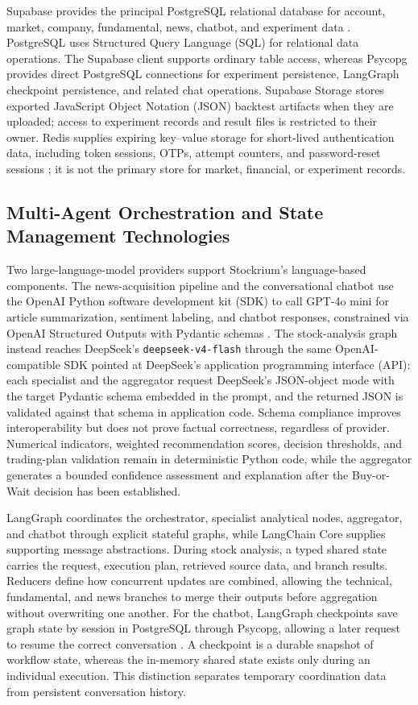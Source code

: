 Supabase provides the principal PostgreSQL relational database for account, market, company, fundamental, news, chatbot, and experiment data \cite{supabaseDatabase2026}. PostgreSQL uses Structured Query Language (SQL) for relational data operations. The Supabase client supports ordinary table access, whereas Psycopg provides direct PostgreSQL connections for experiment persistence, LangGraph checkpoint persistence, and related chat operations. Supabase Storage stores exported JavaScript Object Notation (JSON) backtest artifacts when they are uploaded; access to experiment records and result files is restricted to their owner. Redis supplies expiring key--value storage for short-lived authentication data, including token sessions, OTPs, attempt counters, and password-reset sessions \cite{redisDataTypes2026}; it is not the primary store for market, financial, or experiment records.

\subsection{Multi-Agent Orchestration and State Management Technologies}

Two large-language-model providers support Stockrium's language-based components. The news-acquisition pipeline and the conversational chatbot use the OpenAI Python software development kit (SDK) to call GPT-4o mini for article summarization, sentiment labeling, and chatbot responses, constrained via OpenAI Structured Outputs with Pydantic schemas \cite{openaiStructuredOutputs2026}. The stock-analysis graph instead reaches DeepSeek's \texttt{deepseek-v4-flash} through the same OpenAI-compatible SDK pointed at DeepSeek's application programming interface (API): each specialist and the aggregator request DeepSeek's JSON-object mode with the target Pydantic schema embedded in the prompt, and the returned JSON is validated against that schema in application code. Schema compliance improves interoperability but does not prove factual correctness, regardless of provider. Numerical indicators, weighted recommendation scores, decision thresholds, and trading-plan validation remain in deterministic Python code, while the aggregator generates a bounded confidence assessment and explanation after the Buy-or-Wait decision has been established.

LangGraph coordinates the orchestrator, specialist analytical nodes, aggregator, and chatbot through explicit stateful graphs, while LangChain Core supplies supporting message abstractions. During stock analysis, a typed shared state carries the request, execution plan, retrieved source data, and branch results. Reducers define how concurrent updates are combined, allowing the technical, fundamental, and news branches to merge their outputs before aggregation without overwriting one another. For the chatbot, LangGraph checkpoints save graph state by session in PostgreSQL through Psycopg, allowing a later request to resume the correct conversation \cite{langgraphPersistence2026}. A checkpoint is a durable snapshot of workflow state, whereas the in-memory shared state exists only during an individual execution. This distinction separates temporary coordination data from persistent conversation history.
